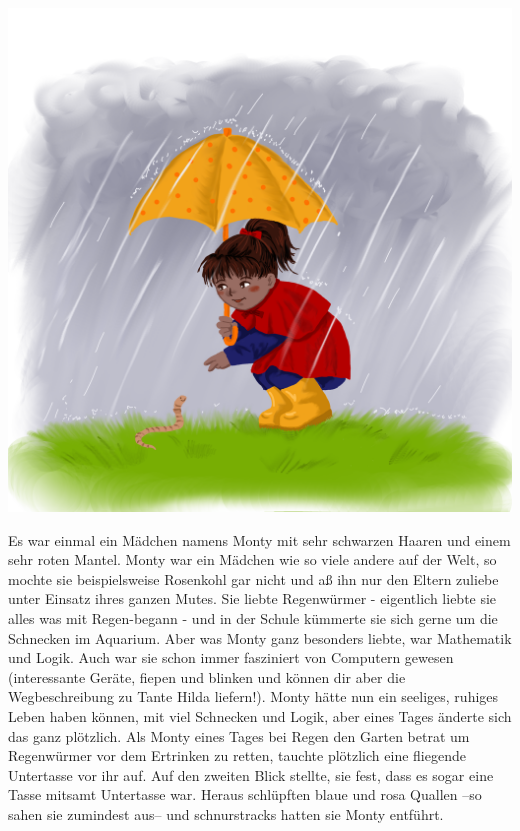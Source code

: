 \documentclass[a5paper,12pt,twoside,openright]{scrbook}
\begin{document}
\begin{center}
 \includegraphics[scale = 0.1]{monty1.png}
\end{center}
Es war einmal ein Mädchen namens Monty mit sehr schwarzen Haaren und einem sehr roten Mantel.
Monty war ein Mädchen wie so viele andere auf der Welt, so mochte sie beispielsweise Rosenkohl 
gar nicht und a{\ss} ihn nur den Eltern zuliebe unter Einsatz ihres ganzen Mutes.
Sie liebte Regenwürmer - eigentlich liebte sie alles was mit \glqq Regen-\grqq begann - und in der Schule kümmerte sie sich gerne 
um die Schnecken im Aquarium. 
Aber was Monty ganz besonders liebte, war Mathematik und Logik.
Auch war sie schon immer fasziniert von Computern gewesen (interessante Geräte, fiepen und blinken 
und können dir aber die Wegbeschreibung zu Tante Hilda liefern!).
Monty hätte nun ein seeliges, ruhiges Leben haben können, mit viel Schnecken und Logik, 
aber eines Tages änderte sich das ganz plötzlich.
Als Monty eines Tages bei Regen den Garten betrat um Regenwürmer vor dem Ertrinken zu retten, 
tauchte plötzlich eine fliegende Untertasse vor ihr auf. 
Auf den zweiten Blick stellte, sie fest, dass es sogar eine Tasse mitsamt Untertasse war.
Heraus schlüpften blaue und rosa Quallen --so sahen sie zumindest aus-- und schnurstracks hatten sie Monty entführt.
\end{document}
